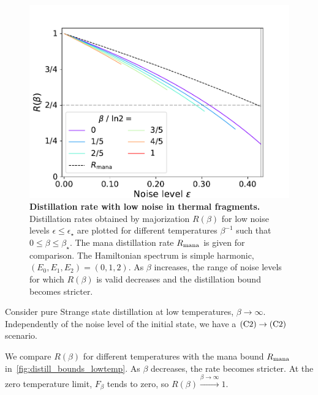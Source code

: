 \documentclass[pra,
aps,
twocolumn,
superscriptaddress,
groupedaddress,
nofootinbib,
reprint
]{revtex4-1}
\begin{document}
\begin{figure}[h]
    \centering
    \includegraphics[scale=0.5]{figs/distill_bounds_temp.pdf}
    \caption{\textbf{Distillation rate with low noise in thermal fragments.} Distillation rates obtained by majorization $R(\beta)$ for low noise levels $\epsilon \leq \epsilon_{\star}$ are plotted for different temperatures $\beta^{-1}$ such that $0 \leq \beta \leq \beta_{\star}$.
    The mana distillation rate $R_{\rm{mana}}$ is given for comparison.
    The Hamiltonian spectrum is simple harmonic, $(E_0, E_1, E_2) = (0,1,2)$.
    As $\beta$ increases, the range of noise levels for which $R(\beta)$ is valid decreases and the distillation bound becomes stricter.
    }
    \label{fig:distill_bounds_temp}
\end{figure}

Consider pure Strange state distillation at low temperatures, $\beta \rightarrow \infty$.
Independently of the noise level of the initial state, we have a $\rm{(C2)} \rightarrow \rm{(C2)}$ scenario.

We compare $R(\beta)$ for different temperatures with the mana bound $R_{\rm{mana}}$ in~\cref{fig:distill_bounds_lowtemp}.
As $\beta$ decreases, the rate becomes stricter.
At the zero temperature limit, $F_\beta$ tends to zero, so $R(\beta) \xrightarrow{\beta \rightarrow \infty} 1$.
\end{document}
